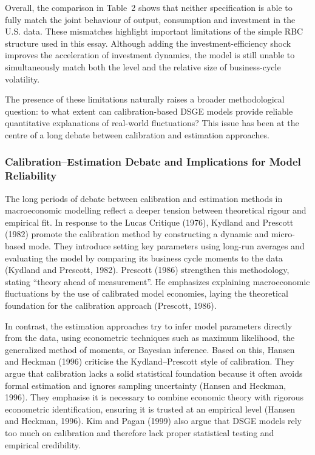 \documentclass[12pt]{article}
\begin{document}
Overall, the comparison in Table~2 shows that neither specification is able to fully match
the joint behaviour of output, consumption and investment in the U.S. data. 
These mismatches highlight important limitations of the simple RBC structure used in this essay.  
Although adding the investment-efficiency shock improves the acceleration of investment dynamics,
the model is still unable to simultaneously match both the level and the relative size of 
business-cycle volatility. 

The presence of these limitations naturally raises a broader methodological question: 
to what extent can calibration-based DSGE models provide reliable quantitative explanations of 
real-world fluctuations? This issue has been at the centre of a long debate between 
calibration and estimation approaches.

\subsubsection{Calibration–Estimation Debate and Implications for Model Reliability}

The long periods of debate between calibration and estimation methods in macroeconomic modelling reflect a deeper tension between theoretical rigour and empirical fit. In response to the Lucas Critique (1976), Kydland and Prescott (1982) promote the calibration method by constructing a dynamic and micro-based mode. They introduce setting key parameters using long-run averages and evaluating the model by comparing its business cycle moments to the data (Kydland and Prescott, 1982). Prescott (1986) strengthen this methodology, stating “theory ahead of measurement”. He emphasizes explaining macroeconomic fluctuations by the use of calibrated model economies, laying the theoretical foundation for the calibration approach (Prescott, 1986).

In contrast, the estimation approaches try to infer model parameters directly from the data, using econometric techniques such as maximum likelihood, the generalized method of moments, or Bayesian inference. Based on this, Hansen and Heckman (1996) criticise the Kydland–Prescott style of calibration. They argue that calibration lacks a solid statistical foundation because it often avoids formal estimation and ignores sampling uncertainty (Hansen and Heckman, 1996). They emphasise it is necessary to combine economic theory with rigorous econometric identification, ensuring it is trusted at an empirical level (Hansen and Heckman, 1996).  Kim and Pagan (1999) also argue that DSGE models rely too much on calibration and therefore lack proper statistical testing and empirical credibility.
\end{document}
